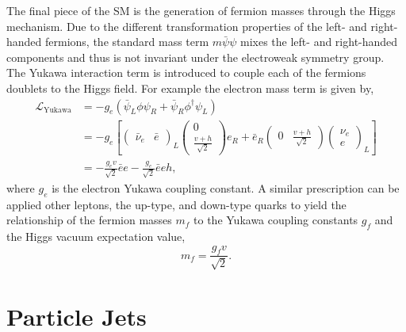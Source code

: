 The final piece of the SM is the generation of fermion masses through the Higgs mechanism.
Due to the different transformation properties of the left- and right-handed fermions, the standard mass term $m \bar \psi \psi$ mixes the left- and right-handed components and thus is not invariant under the electroweak symmetry group.
The Yukawa interaction term is introduced to couple each of the fermions doublets to the Higgs field.
For example the electron mass term is given by,
\begin{equation}
	\label{eq:yukawa}
	\begin{split}
		\mathcal{L}_\text{Yukawa} & = -g_e( \bar \psi_L \phi \psi_R + \bar \psi_R \phi^\dagger \psi_L)    \\
		                          & = -g_e \left[
			\begin{pmatrix} \bar \nu_e & \bar e \end{pmatrix}_L \begin{pmatrix} 0 \\ \frac{v + h}{\sqrt{2}} \end{pmatrix} e_R
			+ \bar e_R \begin{pmatrix} 0 & \frac{v + h}{\sqrt{2}} \end{pmatrix} \begin{pmatrix} \nu_e \\ e \end{pmatrix}_L
		\right]                                                                                           \\
		                          & = -\frac{g_e v}{\sqrt{2}} \bar e e - \frac{g_e}{\sqrt{2}} \bar e e h,
	\end{split}
\end{equation}
where $g_e$ is the electron Yukawa coupling constant.
A similar prescription can be applied other leptons, the up-type, and down-type quarks to yield the relationship of the fermion masses $m_f$ to the Yukawa coupling constants $g_f$ and the Higgs vacuum expectation value,
\begin{equation}
	\label{eq:fermion_mass}
	m_f = \frac{g_f v}{\sqrt{2}}.
\end{equation}

\section{Particle Jets}
\label{sec:jets}

